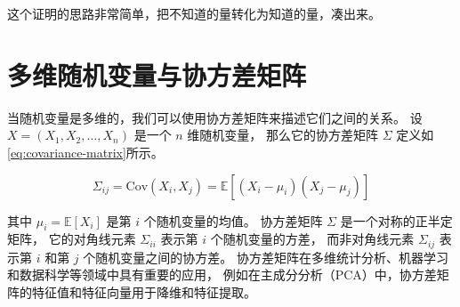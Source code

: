 \documentclass[a4paper]{ctexart}
\begin{document}
这个证明的思路非常简单，把不知道的量转化为知道的量，凑出来。

\section{多维随机变量与协方差矩阵}
当随机变量是多维的，我们可以使用协方差矩阵来描述它们之间的关系。
设 $X = (X_1, X_2, \ldots, X_n)$ 是一个 $n$ 维随机变量，
那么它的协方差矩阵 $\Sigma$ 定义如\eqref{eq:covariance-matrix}所示。

\begin{equation}
    \Sigma_{ij} = \mathrm{Cov}(X_i, X_j) = \mathbb{E}[(X_i - \mu_i)(X_j - \mu_j)]
    \label{eq:covariance-matrix}
\end{equation}

其中 $\mu_i = \mathbb{E}[X_i]$ 是第 $i$ 个随机变量的均值。
协方差矩阵 $\Sigma$ 是一个对称的正半定矩阵，
它的对角线元素 $\Sigma_{ii}$ 表示第 $i$ 个随机变量的方差，
而非对角线元素 $\Sigma_{ij}$ 表示第 $i$ 和第 $j$ 个随机变量之间的协方差。
协方差矩阵在多维统计分析、机器学习和数据科学等领域中具有重要的应用，
例如在主成分分析（PCA）中，协方差矩阵的特征值和特征向量用于降维和特征提取。
\end{document}
